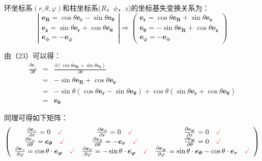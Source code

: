 \documentclass[UTF8]{ctexart}
\newcommand{\tmcolor}[2]{{\color{#1}{#2}}}
\newcommand{\tmmathbf}[1]{\ensuremath{\boldsymbol{#1}}}
\begin{document}
环坐标系$(r, \theta,
\varphi)$和柱坐标系($R$，$\phi$，$z$)的坐标基失变换关系为：
\begin{equation}
  \left|\begin{array}{c}
    \tmmathbf{e_R} = \cos \theta \tmmathbf{e_r} - \sin \theta \tmmathbf{}
    \tmmathbf{e_{\theta}}\\
    \tmmathbf{e_z} = \sin \theta \tmmathbf{e_r} + \cos \theta
    \tmmathbf{e_{\theta}}\\
    \tmmathbf{e_{\phi}} = - \tmmathbf{e_{\varphi}}
  \end{array}\right| \Longrightarrow \left(\begin{array}{c}
    \tmmathbf{e_r} = \cos \theta \tmmathbf{e_R} + \sin \theta \tmmathbf{e_z}\\
    \tmmathbf{e_{\theta}} = - \sin \theta \tmmathbf{e_R} + \cos \theta
    \tmmathbf{e_z}\\
    \tmmathbf{e_{\varphi}} = - \tmmathbf{e_{\phi}}
  \end{array}\right)
\end{equation}


由（23）可以得：
\begin{eqnarray*}
  \frac{\partial \tmmathbf{e_{}}_r}{\partial \theta} & = & \frac{\partial
  (\cos \theta \tmmathbf{e_R} + \sin \theta \tmmathbf{e_z})}{\partial
  \theta}\\
  & = & - \sin \theta \tmmathbf{e_R} + \cos \theta \tmmathbf{e_z}\\
  & = & - \sin \theta (\cos \theta \tmmathbf{e_r} - \sin \theta \tmmathbf{}
  \tmmathbf{e_{\theta}}) + \cos \theta (\sin \theta \tmmathbf{e_r} + \cos
  \theta \tmmathbf{e_{\theta}})\\
  & = & \tmmathbf{e_{\theta}}
\end{eqnarray*}


同理可得如下矩阵：
\begin{equation}\label{eq62}
  \left(\begin{array}{ccc}
    \frac{\partial \tmmathbf{e} \tmmathbf{_{}}_r}{\partial r} = 0 \quad
    \tmcolor{red}{\checked} & \frac{\partial
    \tmmathbf{e_{}}_{\theta}}{\partial r} = 0 \quad \tmcolor{red}{\checked} &
    \frac{\partial \tmmathbf{e_{\varphi}} \tmmathbf{_{}}}{\partial r} = 0
    \quad \tmcolor{red}{\checked}\\
    \frac{\partial \tmmathbf{e_{}}_r}{\partial \theta} = \tmmathbf{e_{\theta}}
    \quad \tmcolor{red}{\checked} & \frac{\partial
    \tmmathbf{e_{}}_{\theta}}{\partial \theta} = - \tmmathbf{e_r} \quad
    \tmcolor{red}{\checked} & \frac{\partial \tmmathbf{e_{\varphi}}
    \tmmathbf{_{}}}{\partial \theta} = 0 \quad \tmcolor{red}{\checked}\\
    \frac{\partial \tmmathbf{e_{}}_r}{\partial \varphi} = \cos \theta \cdot
    \tmmathbf{e_{\varphi}} \quad \tmcolor{red}{\checked} & \frac{\partial
    \tmmathbf{e_{}}_{\theta}}{\partial \varphi} = - \sin \theta \cdot
    \tmmathbf{e_{\varphi}} \quad \tmcolor{red}{\checked} & \frac{\partial
    \tmmathbf{e_{\varphi}} \tmmathbf{_{}}}{\partial \varphi} = \sin \theta
    \cdot \tmmathbf{e_{\theta}} - \cos \theta \cdot \tmmathbf{e_r} \quad
    \tmcolor{red}{\checked}
  \end{array}\right)
\end{equation}
\end{document}

